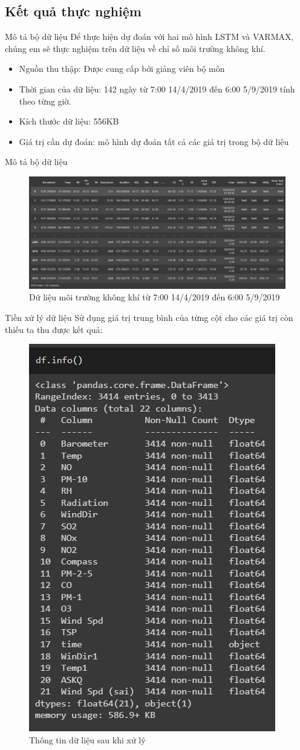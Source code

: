 \documentclass[notheorems,hyperref={bookmarks=true}]{beamer}
\theoremstyle{plain}
\numberwithin{equation}{section}
\begin{document}
\begin{footnotesize}
    \section{Kết quả thực nghiệm}
    \begin{frame}{Mô tả bộ dữ liệu}
Để thực hiện dự đoán với hai mô hình  LSTM và VARMAX, chúng em sẽ thực nghiệm trên dữ liệu về chỉ số môi trường không khí.
\begin{itemize}
    \item Nguồn thu thập: Được cung cấp bởi giảng viên bộ môn
    \item Thời gian của dữ liệu: 142 ngày từ 7:00 14/4/2019 đến 6:00 5/9/2019 tính theo từng giờ.
    \item Kích thước dữ liệu: 556KB
    \item Giá trị cần dự đoán: mô hình dự đoán tất cả các giá trị trong bộ dữ liệu
\end{itemize}
    \end{frame}
        \begin{frame}{Mô tả bộ dữ liệu}
\begin{figure}[H]
    \centering
    \includegraphics[width=.95\textwidth]{figures/data.jpg}
    \caption[Dữ liệu môi trường không khí từ  7:00 14/4/2019 đến 6:00 5/9/2019]{Dữ liệu môi trường không khí từ  7:00 14/4/2019 đến 6:00 5/9/2019}
\end{figure}
    \end{frame}
\begin{frame}{Tiền xử lý dữ liệu}
\noindent Sử dụng giá trị trung bình của từng cột cho các giá trị còn thiếu ta thu được kết quả:
\begin{figure}[H]
    \centering
    \includegraphics[width=.3\textwidth]{figures/info.jpg}
    \caption[Thông tin dữ liệu sau khi xử lý]{Thông tin dữ liệu sau khi xử lý}
\end{figure}
    \end{frame}
    

\end{footnotesize}
\end{document}
